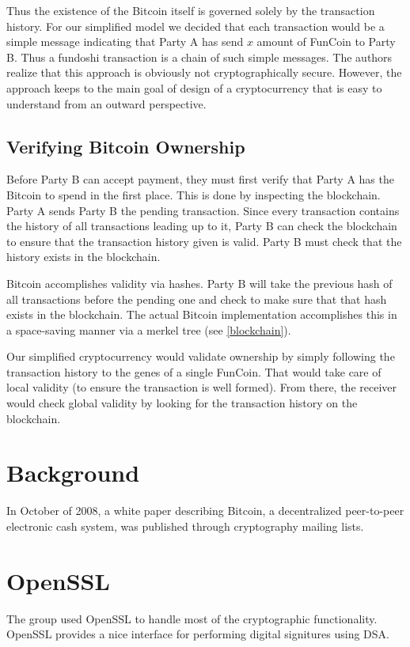 \documentclass[12pt]{article}
\begin{document}
Thus the existence of the Bitcoin itself is governed solely by the transaction history. For our
simplified model we decided that each transaction would be a simple message indicating that Party
A has send $x$ amount of FunCoin to Party B. Thus a fundoshi transaction is a chain of such simple
messages. The authors realize that this approach is obviously not cryptographically secure. However,
the approach keeps to the main goal of design of a cryptocurrency that is easy to understand from an
outward perspective.

\subsection{Verifying Bitcoin Ownership}
Before Party B can accept payment, they must first verify that Party A has the Bitcoin to spend in the first
place. This is done by inspecting the blockchain. Party A sends Party B the pending transaction. Since every
transaction contains the history of all transactions leading up to it, Party B can check the blockchain
to ensure that the transaction history given is valid. Party B must check that the history
exists in the blockchain.

Bitcoin accomplishes validity via hashes. Party B will take the previous hash of all transactions before the pending one
and check to make sure that that hash exists in the blockchain. The actual Bitcoin implementation accomplishes
this in a space-saving manner via a merkel tree (see \ref{blockchain}).

Our simplified cryptocurrency would validate ownership by simply following the transaction history to the
genes of a single FunCoin. That would take care of local validity (to ensure the transaction is well formed).
From there, the receiver would check global validity by looking for the transaction history on the blockchain.



\section{Background}
In October of 2008, a white paper\cite{nakamoto:bitcoin} describing Bitcoin, a decentralized peer-to-peer electronic cash system, was published through cryptography mailing lists.

\section{OpenSSL}
The group used OpenSSL to handle most of the cryptographic functionality. OpenSSL provides a nice interface for performing digital signitures using DSA.
\end{document}

